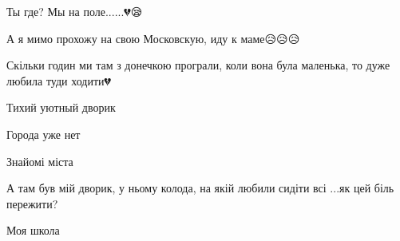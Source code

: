  
 
 
 
 

\qqSecCmt


Ты где? Мы на поле......💔😪


А я мимо прохожу на свою Московскую, иду к маме😥😥😥


Скільки годин ми там з донечкою програли, коли вона була маленька, то дуже любила туди ходити💔


Тихий уютный дворик


Города уже нет


Знайомі міста🤗🤗🤗


А там був мій дворик, у ньому колода, на якій любили сидіти всі ...як цей біль пережити?


Моя школа
